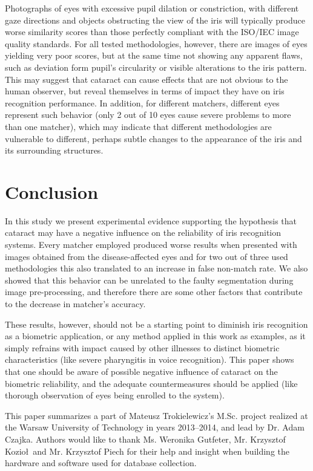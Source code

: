 \documentclass[a4paper]{spie}
\begin{document}
Photographs of eyes with excessive pupil dilation or constriction, with different gaze directions and objects obstructing the view of the iris will typically produce worse similarity scores than those perfectly compliant with the ISO/IEC image quality standards. For all tested methodologies, however, there are images of eyes yielding very poor scores, but at the same time not showing any apparent flaws, such as deviation form pupil's circularity or visible alterations to the iris pattern. This may suggest that cataract can cause effects that are not obvious to the human observer, but reveal themselves in terms of impact they have on iris recognition performance. In addition, for different matchers, different eyes represent such behavior (only 2 out of 10 eyes cause severe problems to more than one matcher), which may indicate that different methodologies are vulnerable to different, perhaps subtle changes to the appearance of the iris and its surrounding structures.

\section{Conclusion}
In this study we present experimental evidence supporting the hypothesis that cataract may have a negative influence on the reliability of iris recognition systems. Every matcher employed produced worse results when presented with images obtained from the disease-affected eyes and for two out of three used methodologies this also translated to an increase in false non-match rate. We also showed that this behavior can be unrelated to the faulty segmentation during image pre-processing, and therefore there are some other factors that contribute to the decrease in matcher's accuracy. 

These results, however, should not be a starting point to diminish iris recognition as a biometric application, or any method applied in this work as examples, as it simply refrains with impact caused by other illnesses to distinct biometric characteristics (like severe pharyngitis in voice recognition). This paper shows that one should be aware of possible negative influence of cataract on the biometric reliability, and the adequate countermeasures should be applied (like thorough observation of eyes being enrolled to the system). 

\acknowledgments        
This paper summarizes a part of Mateusz Trokielewicz's M.Sc. project realized at the Warsaw University of Technology in years 2013--2014, and lead by Dr. Adam Czajka. Authors would like to thank Ms. Weronika Gutfeter, Mr. Krzysztof Kozio\l \, and Mr. Krzysztof Piech for their help and insight when building the hardware and software used for database collection.
\end{document}

